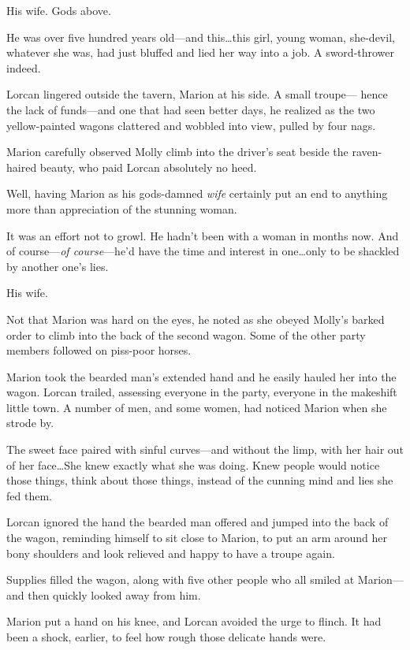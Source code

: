 His wife.
Gods above.

He was over five hundred years old---and this\ldots this girl, young woman, she-devil, whatever she was, had just bluffed and lied her way into a job.
A sword-thrower indeed.

Lorcan lingered outside the tavern, Marion at his side.
A small troupe--- hence the lack of funds---and one that had seen better days, he realized as the two yellow-painted wagons clattered and wobbled into view, pulled by four nags.

Marion carefully observed Molly climb into the driver's seat beside the raven-haired beauty, who paid Lorcan absolutely no heed.

Well, having Marion as his gods-damned \emph{wife} certainly put an end to anything more than appreciation of the stunning woman.

It was an effort not to growl.
He hadn't been with a woman in months now.
And of course---\emph{of course}---he'd have the time and interest in one\ldots only to be shackled by another one's lies.

His wife.

Not that Marion was hard on the eyes, he noted as she obeyed Molly's barked order to climb into the back of the second wagon.
Some of the other party members followed on piss-poor horses.

Marion took the bearded man's extended hand and he easily hauled her into the wagon.
Lorcan trailed, assessing everyone in the party, everyone in the makeshift little town.
A number of men, and some women, had noticed Marion when she strode by.

The sweet face paired with sinful curves---and without the limp, with her hair out of her face\ldots She knew exactly what she was doing.
Knew people would notice those things, think about those things, instead of the cunning mind and lies she fed them.

Lorcan ignored the hand the bearded man offered and jumped into the back of the wagon, reminding himself to sit close to Marion, to put an arm around her bony shoulders and look relieved and happy to have a troupe again.

Supplies filled the wagon, along with five other people who all smiled at Marion---and then quickly looked away from him.

Marion put a hand on his knee, and Lorcan avoided the urge to flinch.
It had been a shock, earlier, to feel how rough those delicate hands were.

